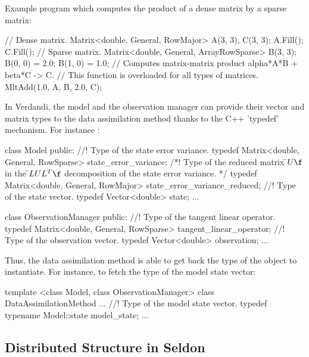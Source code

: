 \documentclass{tufte-book}
\begin{document}
Example program which computes the product of a dense matrix by a sparse matrix:


\begin{frame_cpp}
// Dense  matrix.
Matrix<double, General, RowMajor> A(3, 3), C(3, 3);
A.Fill();
C.Fill();
// Sparse matrix.
Matrix<double, General, ArrayRowSparse> B(3, 3);
B(0, 0) = 2.0;
B(1, 0) = 1.0;
// Computes matrix-matrix product alpha*A*B + beta*C -> C.
// This function is overloaded for all types of matrices.
MltAdd(1.0, A, B, 2.0, C);
\end{frame_cpp}


In Verdandi, the model and the observation manager can provide their vector and matrix types to the data assimilation method thanks to the C++ 'typedef' mechanism. For instance :


\begin{frame_cpp}
class Model
{
    public:
        //! Type of the state error variance.
        typedef Matrix<double, General, RowSparse> state_error_variance;
        /*! \brief Type of the reduced matrix \f$U\f$ in the \f$LUL^T\f$
        decomposition of the state error variance. */
        typedef Matrix<double, General, RowMajor> state_error_variance_reduced;
        //! Type of the state vector.
        typedef Vector<double> state;
	...
}
\end{frame_cpp}


\begin{frame_cpp}
class ObservationManager
{
    public:
        //! Type of the tangent linear operator.
        typedef Matrix<double, General, RowSparse> tangent_linear_operator;
        //! Type of the observation vector.
        typedef Vector<double> observation;
	...
}
\end{frame_cpp}


Thus, the data assimilation method is able to get back the type of the object to instantiate. For instance, to fetch the type of the model state vector:

\begin{frame_cpp}
template <class Model, class ObservationManager>
class DataAssimilationMethod
{
...
        //! Type of the model state vector.
        typedef typename Model::state model_state;
...
}
\end{frame_cpp}



\hypertarget{seq-par-ds}{}\subsection{Distributed Structure in Seldon}\label{seq-par-ds}
\end{document}
